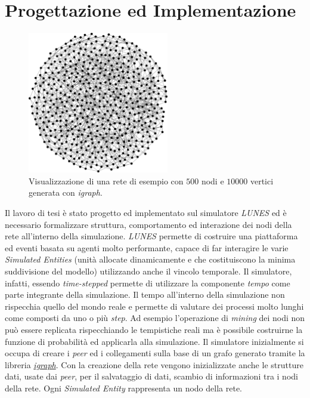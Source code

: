 \chapter{Progettazione ed Implementazione}

\begin{figure}[H]
    \centering
    \includegraphics[width=0.55\textwidth]{images/network-500.png}
    \caption{Visualizzazione di una rete di esempio con $500$ nodi e $10000$ vertici generata con \textit{igraph}.}
\end{figure}
Il lavoro di tesi è stato progetto ed implementato sul simulatore \textit{LUNES} ed è necessario formalizzare struttura, comportamento ed interazione dei nodi della rete all'interno della simulazione.\newline
\textit{LUNES} permette di costruire una piattaforma ed eventi basata su agenti molto performante, capace di far interagire le varie \textit{Simulated Entities} (unità allocate dinamicamente e che costituiscono la minima suddivisione del modello) utilizzando anche il vincolo temporale. Il simulatore, infatti, essendo \textit{time-stepped} permette di utilizzare la componente \textit{tempo} come parte integrante della simulazione. Il tempo all'interno della simulazione non rispecchia quello del mondo reale e permette di valutare dei processi molto lunghi come composti da uno o più \textit{step}. Ad esempio l'operazione di \textit{mining} dei nodi non può essere replicata rispecchiando le tempistiche reali ma è possibile costruirne la funzione di probabilità ed applicarla alla simulazione.\newline
Il simulatore inizialmente si occupa di creare i \textit{peer} ed i collegamenti sulla base di un grafo generato tramite la libreria \href{https://igraph.org/}{\textit{igraph}}. Con la creazione della rete vengono inizializzate anche le strutture dati, usate dai \textit{peer}, per il salvataggio di dati, scambio di informazioni tra i nodi della rete. Ogni \textit{Simulated Entity} rappresenta un nodo della rete.\newline
